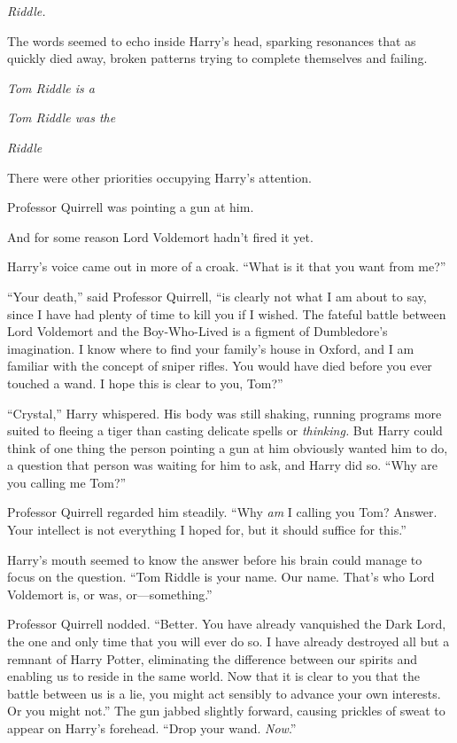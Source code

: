 
 \emph{Riddle.}

\hplettrineextrapara
The words seemed to echo inside Harry’s head, sparking resonances that as quickly died away, broken patterns trying to complete themselves and failing.

\emph{Tom Riddle is a}

\emph{Tom Riddle was the}

\emph{Riddle}

There were other priorities occupying Harry’s attention.

Professor Quirrell was pointing a gun at him.

And for some reason Lord Voldemort hadn’t fired it yet.

Harry’s voice came out in more of a croak. “What is it that you want from me?”

“Your death,” said Professor Quirrell, “is clearly not what I am about to say, since I have had plenty of time to kill you if I wished. The fateful battle between Lord Voldemort and the Boy-Who-Lived is a figment of Dumbledore’s imagination. I know where to find your family’s house in Oxford, and I am familiar with the concept of sniper rifles. You would have died before you ever touched a wand. I hope this is clear to you, Tom?”

“Crystal,” Harry whispered. His body was still shaking, running programs more suited to fleeing a tiger than casting delicate spells or \emph{thinking.} But Harry could think of one thing the person pointing a gun at him obviously wanted him to do, a question that person was waiting for him to ask, and Harry did so. “Why are you calling me Tom?”

Professor Quirrell regarded him steadily. “Why \emph{am} I calling you Tom? Answer. Your intellect is not everything I hoped for, but it should suffice for this.”

Harry’s mouth seemed to know the answer before his brain could manage to focus on the question. “Tom Riddle is your name. Our name. That’s who Lord Voldemort is, or was, or—something.”

Professor Quirrell nodded. “Better. You have already vanquished the Dark Lord, the one and only time that you will ever do so. I have already destroyed all but a remnant of Harry Potter, eliminating the difference between our spirits and enabling us to reside in the same world. Now that it is clear to you that the battle between us is a lie, you might act sensibly to advance your own interests. Or you might not.” The gun jabbed slightly forward, causing prickles of sweat to appear on Harry’s forehead. “Drop your wand. \emph{Now}.”

